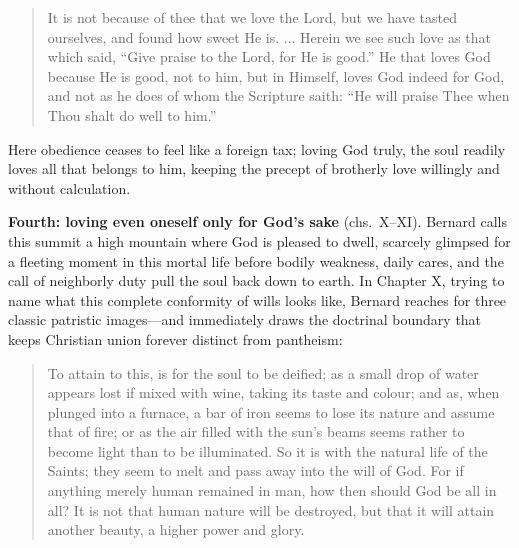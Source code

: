 \begin{quote}
It is not because of thee that we love the Lord, but we have tasted ourselves, and found how sweet He is. ... Herein we see such love as that which said, ``Give praise to the Lord, for He is good.'' He that loves God because He is good, not to him, but in Himself, loves God indeed for God, and not as he does of whom the Scripture saith: ``He will praise Thee when Thou shalt do well to him.''
\end{quote}

Here obedience ceases to feel like a foreign tax; loving God truly, the soul readily loves all that belongs to him, keeping the precept of brotherly love willingly and without calculation.

\textbf{Fourth: loving even oneself only for God's sake} (chs.\ X--XI). Bernard calls this summit a high mountain where God is pleased to dwell, scarcely glimpsed for a fleeting moment in this mortal life before bodily weakness, daily cares, and the call of neighborly duty pull the soul back down to earth. In Chapter X, trying to name what this complete conformity of wills looks like, Bernard reaches for three classic patristic images---and immediately draws the doctrinal boundary that keeps Christian union forever distinct from pantheism:

\begin{quote}
To attain to this, is for the soul to be deified; as a small drop of water appears lost if mixed with wine, taking its taste and colour; and as, when plunged into a furnace, a bar of iron seems to lose its nature and assume that of fire; or as the air filled with the sun's beams seems rather to become light than to be illuminated. So it is with the natural life of the Saints; they seem to melt and pass away into the will of God. For if anything merely human remained in man, how then should God be all in all? It is not that human nature will be destroyed, but that it will attain another beauty, a higher power and glory.
\end{quote}

